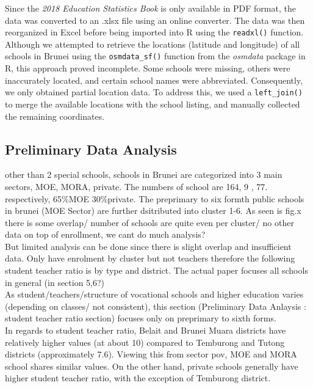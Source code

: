 \documentclass[12pt]{article}
\begin{document}
Since the \textit{2018 Education Statistics Book} is only available in PDF format, the data was converted to an .xlsx file using an online converter. The data was then reorganized in Excel before being imported into R using the \texttt{readxl()} function. \\

Although we attempted to retrieve the locations (latitude and longitude) of all schools in Brunei using the \texttt{osmdata\_sf()} function from the \textit{osmdata} package in R, this approach proved incomplete. Some schools were missing, others were inaccurately located, and certain school names were abbreviated. Consequently, we only obtained partial location data. To address this, we used a \texttt{left\_join()} to merge the available locations with the school listing, and manually collected the remaining coordinates. \\


\subsection{Preliminary Data Analysis}
other than 2 special schools, schools in Brunei are categorized into 3 main sectors, MOE, MORA, private. The numbers of school are 164, 9 , 77. respectively, 65\%MOE 30\%private. The preprimary to six formth public schools in brunei (MOE Sector) are  further dsitributed into cluster 1-6. As seen is fig.x there is some overlap/ number of schools are quite even per cluster/ no other data on top of enrollment, we cant do much analysis?
\\ 

But limited analysis can be done since there is slight overlap and insufficient data. Only have enrolment by cluster but not teachers therefore the following student teacher ratio is by type and district. The actual paper focuses all schools in general (in section 5,6?) \\ 

As student/teachers/structure of vocational schools and higher education varies (depending on classes/ not consistent), this section (Preliminary Data Anlaysis : student teacher ratio section) focuses only on preprimary to sixth forms. \\

In regards to student teacher ratio, Belait and Brunei Muara districts have relatively higher values (at about 10) compared to Temburong and Tutong districts (approximately 7.6). Viewing this from sector pov, MOE and MORA school shares similar values. On the other hand, private schools generally have higher student teacher ratio, with the exception of Temburong district. 
\end{document}
